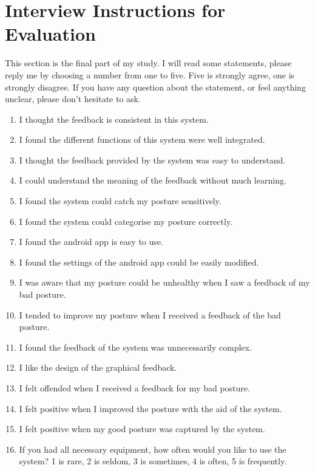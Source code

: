 \chapter{Interview Instructions for Evaluation}
\label{appendix:interview_instructions}

This section is the final part of my study. I will read some statements, please reply me by choosing a number from one to five. Five is strongly agree, one is strongly disagree. If you have any question about the statement, or feel anything unclear, please don’t hesitate to ask.

\begin{enumerate}
  \item I thought the feedback is consistent in this system.
  \item I found the different functions of this system were well integrated.
  \item I thought the feedback provided by the system was easy to understand.
  \item I could understand the meaning of the feedback without much learning.
  \item I found the system could catch my posture sensitively.
  \item I found the system could categorise my posture correctly.
  \item I found the android app is easy to use.
  \item I found the settings of the android app could be easily modified.
  \item I was aware that my posture could be unhealthy when I saw a feedback of my bad posture.
  \item I tended to improve my posture when I received a feedback of the bad posture.
  \item I found the feedback of the system was unnecessarily complex.
  \item I like the design of the graphical feedback.
  \item I felt offended when I received a feedback for my bad posture.
  \item I felt positive when I improved the posture with the aid of the system.
  \item I felt positive when my good posture was captured by the system.
  \item If you had all necessary equipment, how often would you like to use the system? 1 is rare, 2 is seldom, 3 is sometimes, 4 is often, 5 is frequently.
\end{enumerate}

